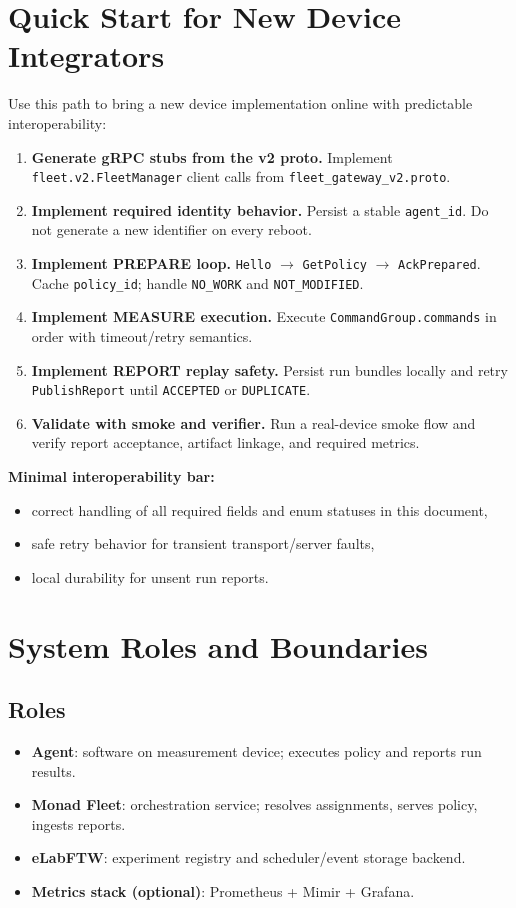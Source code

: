 \documentclass[11pt,a4paper]{article}
\begin{document}
\section{Quick Start for New Device Integrators}
Use this path to bring a new device implementation online with predictable interoperability:
\begin{enumerate}
  \item \textbf{Generate gRPC stubs from the v2 proto.}
  Implement \texttt{fleet.v2.FleetManager} client calls from \texttt{fleet\_gateway\_v2.proto}.
  \item \textbf{Implement required identity behavior.}
  Persist a stable \texttt{agent\_id}. Do not generate a new identifier on every reboot.
  \item \textbf{Implement PREPARE loop.}
  \texttt{Hello} $\rightarrow$ \texttt{GetPolicy} $\rightarrow$ \texttt{AckPrepared}.
  Cache \texttt{policy\_id}; handle \texttt{NO\_WORK} and \texttt{NOT\_MODIFIED}.
  \item \textbf{Implement MEASURE execution.}
  Execute \texttt{CommandGroup.commands} in order with timeout/retry semantics.
  \item \textbf{Implement REPORT replay safety.}
  Persist run bundles locally and retry \texttt{PublishReport} until \texttt{ACCEPTED} or \texttt{DUPLICATE}.
  \item \textbf{Validate with smoke and verifier.}
  Run a real-device smoke flow and verify report acceptance, artifact linkage, and required metrics.
\end{enumerate}

\textbf{Minimal interoperability bar:}
\begin{itemize}
  \item correct handling of all required fields and enum statuses in this document,
  \item safe retry behavior for transient transport/server faults,
  \item local durability for unsent run reports.
\end{itemize}

\section{System Roles and Boundaries}
\subsection{Roles}
\begin{itemize}
  \item \textbf{Agent}: software on measurement device; executes policy and reports run results.
  \item \textbf{Monad Fleet}: orchestration service; resolves assignments, serves policy, ingests reports.
  \item \textbf{eLabFTW}: experiment registry and scheduler/event storage backend.
  \item \textbf{Metrics stack (optional)}: Prometheus + Mimir + Grafana.
\end{itemize}
\end{document}
